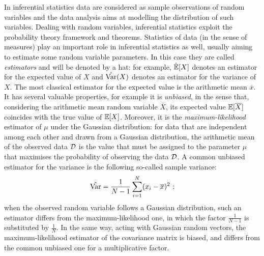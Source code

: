 In inferential statistics data are considered as sample observations of random variables and the data analysis aims at modelling the distribution of such variables. Dealing with random variables, inferential statistics exploit the probability theory framework and theorems. Statistics of data (in the sense of measures) play an important role in inferential statistics as well, usually aiming to estimate some random variable parameters. In this case they are called \emph{estimators} and will be denoted by a hat: for example, $\hat{\mathbb{E}}[X]$  denotes an estimator for the expected value of $X$ and $\hat{\mathrm{Var}}(X)$ denotes an estimator for the variance of $X$. The most classical estimator for the expected value is the arithmetic mean $\overline{x}$. It has several valuable properties, for example it is \emph{unbiased}, in the sense that, considering the arithmetic mean random variable $\overline{X}$, its expected value $\mathbb{E}[\overline{X}]$ coincides with the true value of $\mathbb{E}[X]$. Moreover, it is the \emph{maximum-likelihood} estimator of $\mu$ under the Gaussian distribution: for data that are independent among each other and drawn from a Gaussian distribution,  the arithmetic mean of the observed data $\mathcal{D}$ is the value that must be assigned to the parameter $\mu$ that maximises the probability of observing the data $\mathcal{D}$. A common unbiased estimator for the variance is the following so-called sample variance: 
\begin{equation}
\hat{\mathrm{Var}} = \frac{1}{N-1}\sum_{i=1}^N(x_i-\overline{x})^2 \mbox{ ;}
\end{equation}
when the observed random variable  follows a Gaussian distribution, such an estimator differs from the maximum-likelihood one, in which the factor $\frac{1}{N-1}$ is substituted by $\frac{1}{N}$. In the same way, acting with Gaussian random vectors, the maximum-likelihood estimator of the covariance matrix is biased, and differs from the common unbiased one for a multiplicative factor. \\

